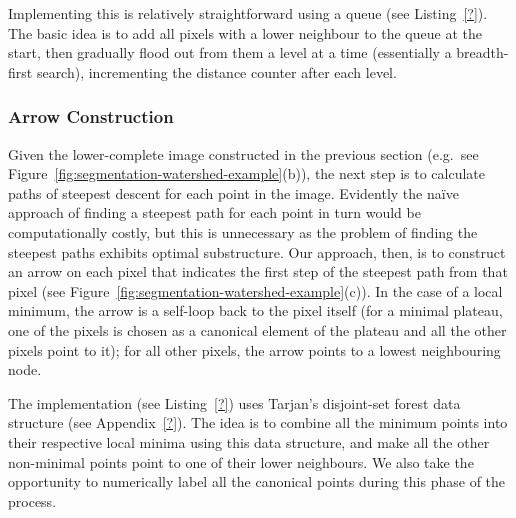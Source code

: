 Implementing this is relatively straightforward using a queue (see Listing~\ref{?}). The basic idea is to add all pixels with a lower neighbour to the queue at the start, then gradually flood out from them a level at a time (essentially a breadth-first search), incrementing the distance counter after each level.

\subsubsection{Arrow Construction}

Given the lower-complete image constructed in the previous section (e.g.~see Figure~\ref{fig:segmentation-watershed-example}(b)), the next step is to calculate paths of steepest descent for each point in the image. Evidently the na\"ive approach of finding a steepest path for each point in turn would be computationally costly, but this is unnecessary as the problem of finding the steepest paths exhibits optimal substructure. Our approach, then, is to construct an arrow on each pixel that indicates the first step of the steepest path from that pixel (see Figure~\ref{fig:segmentation-watershed-example}(c)). In the case of a local minimum, the arrow is a self-loop back to the pixel itself (for a minimal plateau, one of the pixels is chosen as a canonical element of the plateau and all the other pixels point to it); for all other pixels, the arrow points to a lowest neighbouring node.

The implementation (see Listing~\ref{?}) uses Tarjan's disjoint-set forest data structure (see Appendix~\ref{?}). The idea is to combine all the minimum points into their respective local minima using this data structure, and make all the other non-minimal points point to one of their lower neighbours. We also take the opportunity to numerically label all the canonical points during this phase of the process.

